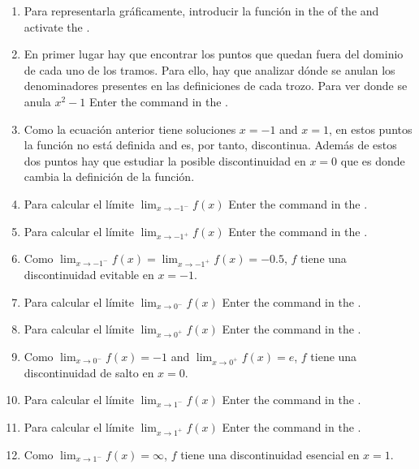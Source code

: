 \begin{enumerate}[leftmargin=*]
      \begin{indication}
      \begin{enumerate}
      \item Para representarla gráficamente, introducir la función  in the  of the   and activate the .
      \item En primer lugar hay que encontrar los puntos que quedan fuera del dominio de cada uno de los tramos.
            Para ello, hay que analizar dónde se anulan los denominadores presentes en las definiciones de cada trozo.
            Para ver donde se anula $x^2-1$ Enter the command  in the .
      \item Como la ecuación anterior tiene soluciones $x=-1$ and $x=1$, en estos puntos la función no está definida and es, por tanto, discontinua.
            Además de estos dos puntos hay que estudiar la posible discontinuidad en $x=0$ que es donde cambia la definición de la función.
      \item Para calcular el límite $\lim_{x\rightarrow -1^-}f(x)$ Enter the command  in the .
      \item Para calcular el límite $\lim_{x\rightarrow -1^+}f(x)$ Enter the command  in the .
      \item Como $\lim_{x\rightarrow -1^-}f(x)=\lim_{x\rightarrow -1^+}f(x)=-0.5$, $f$ tiene una discontinuidad evitable en $x=-1$.
      \item Para calcular el límite $\lim_{x\rightarrow 0^-}f(x)$ Enter the command  in the .
      \item Para calcular el límite $\lim_{x\rightarrow 0^+}f(x)$ Enter the command  in the .
      \item Como $\lim_{x\rightarrow 0^-}f(x)=-1$ and $\lim_{x\rightarrow 0^+}f(x)=e$, $f$ tiene una discontinuidad de salto en $x=0$.
      \item Para calcular el límite $\lim_{x\rightarrow 1^-}f(x)$ Enter the command  in the .
      \item Para calcular el límite $\lim_{x\rightarrow 1^+}f(x)$ Enter the command  in the .
      \item Como $\lim_{x\rightarrow 1^-}f(x)=\infty$, $f$ tiene una discontinuidad esencial en $x=1$.
      \end{enumerate}
      \end{indication}
\end{enumerate}


